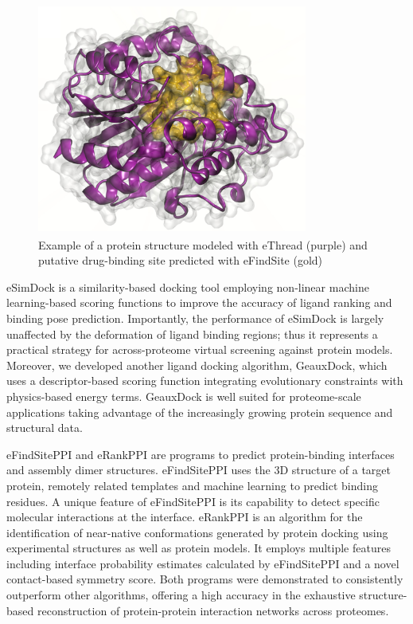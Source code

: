 \documentclass[sigconf]{acmart}
\begin{document}
\begin{figure}
\includegraphics[height=3in, width=3.5in]{Fig1-protein-structure.png}
\caption{Example of a protein structure modeled with eThread (purple) and putative drug-binding site predicted with eFindSite (gold)}
\end{figure}

eSimDock is a similarity-based docking tool employing non-linear machine learning-based scoring functions to improve the accuracy of ligand ranking and binding pose prediction. Importantly, the performance of eSimDock is largely unaffected by the deformation of ligand binding regions; thus it represents a practical strategy for across-proteome virtual screening against protein models. Moreover, we developed another ligand docking algorithm, GeauxDock, which uses a descriptor-based scoring function integrating evolutionary constraints with physics-based energy terms. GeauxDock is well suited for proteome-scale applications taking advantage of the increasingly growing protein sequence and structural data.

eFindSitePPI and eRankPPI are programs to predict protein-binding interfaces and assembly dimer structures. eFindSitePPI uses the 3D structure of a target protein, remotely related templates and machine learning to predict binding residues. A unique feature of eFindSitePPI is its capability to detect specific molecular interactions at the interface. eRankPPI is an algorithm for the identification of near-native conformations generated by protein docking using experimental structures as well as protein models. It employs multiple features including interface probability estimates calculated by eFindSitePPI and a novel contact-based symmetry score. Both programs were demonstrated to consistently outperform other algorithms, offering a high accuracy in the exhaustive structure-based reconstruction of protein-protein interaction networks across proteomes. 
\end{document}
